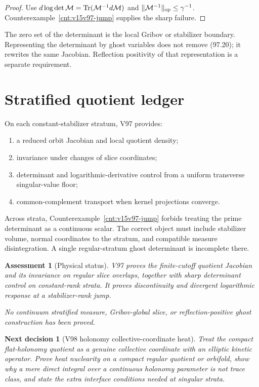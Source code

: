 \documentclass[11pt]{article}
\newtheorem{decision}[theorem]{Next decision}
\newtheorem{assessment}[theorem]{Assessment}
\theoremstyle{remark}
\begin{document}
\begin{proof}
Use
\(d\log\det{\cal M}=\operatorname{Tr}({\cal M}^{-1}d{\cal M})\)
and \(\|{\cal M}^{-1}\|_{\rm op}\leq\gamma^{-1}\).
Counterexample~\ref{cnt:v15v97-jump} supplies the sharp failure.
\end{proof}

The zero set of the determinant is the local Gribov or stabilizer
boundary.  Representing the determinant by ghost variables does
not remove (97.20); it rewrites the same Jacobian.  Reflection
positivity of that representation is a separate requirement.

\section{Stratified quotient ledger}

On each constant-stabilizer stratum, V97 provides:
\begin{enumerate}
\item a reduced orbit Jacobian and local quotient density;
\item invariance under changes of slice coordinates;
\item determinant and logarithmic-derivative control from a
      uniform transverse singular-value floor;
\item common-complement transport when kernel projections converge.
\end{enumerate}
Across strata, Counterexample~\ref{cnt:v15v97-jump} forbids treating
the prime determinant as a continuous scalar.  The correct object
must include stabilizer volume, normal coordinates to the stratum,
and compatible measure disintegration.  A single regular-stratum
ghost determinant is incomplete there.

\begin{assessment}[Physical status]
\label{ass:v15v97-status}
V97 proves the finite-cutoff quotient Jacobian and its invariance on
regular slice overlaps, together with sharp determinant control on
constant-rank strata.  It proves discontinuity and divergent
logarithmic response at a stabilizer-rank jump.

No continuum stratified measure, Gribov-global slice, or
reflection-positive ghost construction has been proved.
\end{assessment}

\begin{decision}[V98 holonomy collective-coordinate heat]
\label{dec:v15v97-next}
Treat the compact flat-holonomy quotient as a genuine collective
coordinate with an elliptic kinetic operator.  Prove heat
nuclearity on a compact regular quotient or orbifold, show why a
mere direct integral over a continuous holonomy parameter is not
trace class, and state the extra interface conditions needed at
singular strata.
\end{decision}
\end{document}
